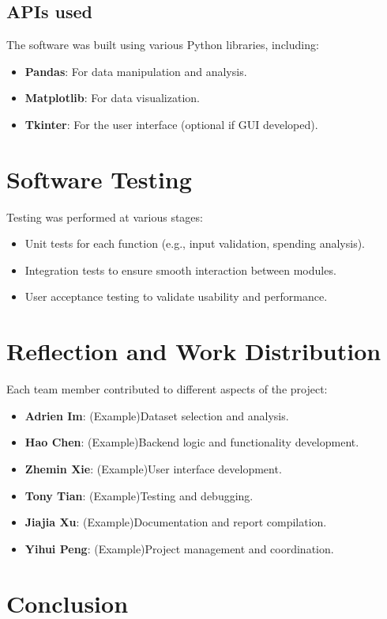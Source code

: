 \documentclass{article}
\begin{document}
\subsection{APIs used}
The software was built using various Python libraries, including: \begin{itemize} \item \textbf{Pandas}: For data manipulation and analysis. \item \textbf{Matplotlib}: For data visualization. \item \textbf{Tkinter}: For the user interface (optional if GUI developed). \end{itemize}


\section{Software Testing}
Testing was performed at various stages: \begin{itemize} \item Unit tests for each function (e.g., input validation, spending analysis). \item Integration tests to ensure smooth interaction between modules. \item User acceptance testing to validate usability and performance. \end{itemize}


\section{Reflection and Work Distribution}
Each team member contributed to different aspects of the project: \begin{itemize} \item \textbf{Adrien Im}: (Example)Dataset selection and analysis. \item \textbf{Hao Chen}: (Example)Backend logic and functionality development. \item \textbf{Zhemin Xie}: (Example)User interface development. \item \textbf{Tony Tian}: (Example)Testing and debugging. \item \textbf{Jiajia Xu}: (Example)Documentation and report compilation. \item \textbf{Yihui Peng}: (Example)Project management and coordination. \end{itemize}

\section{Conclusion}
\end{document}
